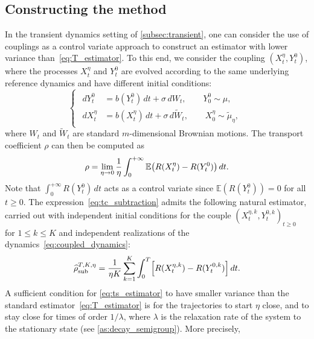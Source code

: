 \documentclass[11pt]{article}
\newcommand{\E}{\mathbb{E}}
\renewcommand{\geq}{\geqslant}
\renewcommand{\leq}{\leqslant}
\DeclarePairedDelimiter\paren{\lparen}{\rparen}
\DeclarePairedDelimiter\bkt{\lbrack}{\rbrack}
\theoremstyle{definition}
\newcommand{\psip}{\widetilde{\mu}_\eta}
\newcommand{\estTmp}{\widehat{\rho}}
\newcommand{\TSest}{\estTmp^{T,K,\eta}_{\rm sub}} %
\begin{document}
\subsection{Constructing the method}
\label{subsec:constructing_method}
In the transient dynamics setting of \cref{subsec:transient}, one can consider the use of couplings as a control variate approach to construct an estimator with lower variance than~\eqref{eq:T_estimator}. To this end, we consider the coupling $(X_t^\eta,Y_t^0)$, where the processes $X_t^\eta$ and $Y_t^0$ are evolved according to the same underlying reference dynamics and have different initial conditions:
\begin{equation}
\begin{cases}
\begin{aligned}
	dY_t^0 &= b(Y_t^0) \, dt + \sigma \, dW_t, \qquad Y_0^0 \sim \mu, \\
	dX_t^\eta &= b(X_t^\eta) \, dt + \sigma \, d\widetilde{W}_t, \qquad X_0^\eta \sim \psip,
\end{aligned}
\end{cases}
\label{eq:coupled_dynamics}
\end{equation}
where $W_t$ and $\widetilde{W}_t$ are standard $m$-dimensional Brownian motions. The transport coefficient $\rho$ can then be computed as
\begin{equation}
\rho = \lim_{\eta\to 0} \frac{1}{\eta}\int_0^{+\infty} \E\paren*{R(X_t^\eta) - R(Y_t^0)}\,  dt.
	\label{eq:tc_subtraction}
\end{equation}
Note that $\int_0^{+\infty} R(Y_t^0) \, dt$ acts as a control variate since $\E(R(Y_t^0))=0$ for all $t\geq 0$. The expression~\eqref{eq:tc_subtraction} admits the following natural estimator, carried out with independent initial conditions for the couple $(X_t^{\eta,k},Y_t^{0,k})_{t\geq 0}$ for $1\leq k\leq K$ and independent realizations of the dynamics~\eqref{eq:coupled_dynamics}:
\begin{equation}
    \TSest = \frac{1}{\eta K} \sum_{k=1}^K \int_0^T \bkt[\Big]{R(X_t^{\eta,k}) - R(Y_t^{0,k})} \, dt.
    \label{eq:ts_estimator}
\end{equation}
A sufficient condition for \eqref{eq:ts_estimator} to have smaller variance than the standard estimator~\eqref{eq:T_estimator} is for the trajectories to start $\eta$ close, and to stay close for times of order $1/\lambda$, where $\lambda$ is the relaxation rate of the system to the stationary state (see \cref{as:decay_semigroup}). More precisely,
\end{document}
